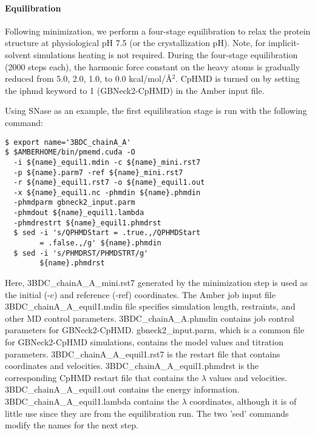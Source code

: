 \paragraph{Equilibration}
Following minimization, we perform a four-stage equilibration
to relax the protein structure at physiological pH 7.5 (or the crystallization pH).
Note, for implicit-solvent simulations heating is not required. 
During the four-stage equilibration (2000 steps each),
the harmonic force constant on the heavy atoms is gradually reduced from 5.0, 2.0, 1.0, to 0.0 kcal/mol/\AA$^2$. 
CpHMD is turned on by setting the iphmd keyword to 1 
(GBNeck2-CpHMD)
in the Amber input file. 

Using SNase as an example, the first equilibration stage is run with the following command:
\begin{lstlisting}
$ export name='3BDC_chainA_A'
$ $AMBERHOME/bin/pmemd.cuda -O
  -i ${name}_equil1.mdin -c ${name}_mini.rst7
  -p ${name}.parm7 -ref ${name}_mini.rst7
  -r ${name}_equil1.rst7 -o ${name}_equil1.out
  -x ${name}_equil1.nc -phmdin ${name}.phmdin
  -phmdparm gbneck2_input.parm
  -phmdout ${name}_equil1.lambda 
  -phmdrestrt ${name}_equil1.phmdrst
  $ sed -i 's/QPHMDStart = .true.,/QPHMDStart
        = .false.,/g' ${name}.phmdin
  $ sed -i 's/PHMDRST/PHMDSTRT/g'
        ${name}.phmdrst
\end{lstlisting}
Here, 3BDC\_chainA\_A\_mini.rst7 generated by the minimization step is used as the initial (-c) and reference (-ref) coordinates. 
The Amber job input file 3BDC\_chainA\_A\_equil1.mdin file specifies simulation length, 
restraints, and other MD control parameters.
3BDC\_chainA\_A.phmdin contains job control parameters
for GBNeck2-CpHMD.  
gbneck2\_input.parm, which is a common file
for GBNeck2-CpHMD simulations,
contains the model {\pka} values
and titration parameters.
3BDC\_chainA\_A\_equil1.rst7 is the restart file that contains coordinates and velocities.
3BDC\_chainA\_A\_equil1.phmdrst is the
corresponding CpHMD restart file that contains
the $\lambda$ values and velocities.  
3BDC\_chainA\_A\_equil1.out contains the energy information. 
3BDC\_chainA\_A\_equil1.lambda contains the $\lambda$ coordinates, although it is of little use since they are from the equilibration run. 
The two 'sed' commands modify the names 
for the next step.


